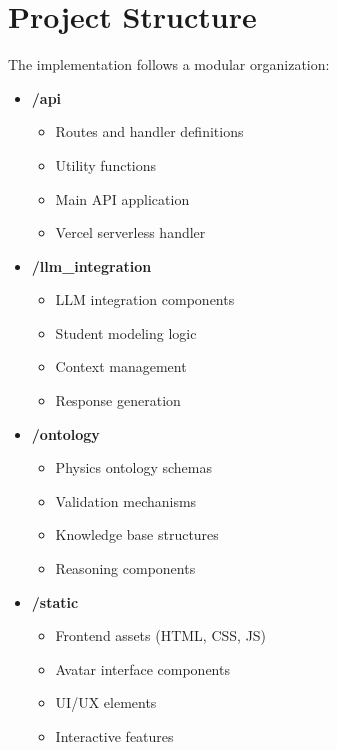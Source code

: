 \section{Project Structure}
\label{sec:project-structure}

The implementation follows a modular organization:

\begin{itemize}
    \item \textbf{/api} 
        \begin{itemize}
            \item Routes and handler definitions
            \item Utility functions
            \item Main API application
            \item Vercel serverless handler
        \end{itemize}
    
    \item \textbf{/llm\_integration}
        \begin{itemize}
            \item LLM integration components
            \item Student modeling logic
            \item Context management
            \item Response generation
        \end{itemize}
    
    \item \textbf{/ontology}
        \begin{itemize}
            \item Physics ontology schemas
            \item Validation mechanisms
            \item Knowledge base structures
            \item Reasoning components
        \end{itemize}
    
    \item \textbf{/static}
        \begin{itemize}
            \item Frontend assets (HTML, CSS, JS)
            \item Avatar interface components
            \item UI/UX elements
            \item Interactive features
        \end{itemize}
\end{itemize}

